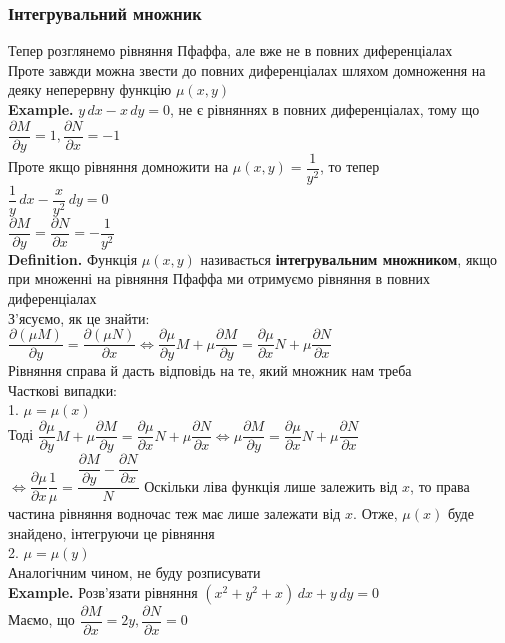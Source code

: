\documentclass[a4paper, 14pt]{extarticle}
\def\bigline{\vspace{5mm}\\}
\begin{document}
\subsubsection{Інтегрувальний множник}
Тепер розглянемо рівняння Пфаффа, але вже не в повних диференціалах\\
Проте завжди можна звести до повних диференціалах шляхом домноження на деяку неперервну функцію $\mu(x,y)$
\bigline
\textbf{Example.} $y\,dx - x\,dy = 0$, не є рівняннях в повних диференціалах, тому що\\
$\dfrac{\partial M}{\partial y} = 1, \dfrac{\partial N}{\partial x} = -1$\\
Проте якщо рівняння домножити на $\mu(x,y) = \dfrac{1}{y^2}$, то тепер\\
$\dfrac{1}{y}\,dx - \dfrac{x}{y^2}\,dy = 0$\\
$\dfrac{\partial M}{\partial y} = \dfrac{\partial N}{\partial x} = -\dfrac{1}{y^2}$
\bigline
\textbf{Definition.} Функція $\mu(x,y)$ називається \textbf{інтегрувальним множником}, якщо при множенні на рівняння Пфаффа ми отримуємо рівняння в повних диференціалах
\bigline
З'ясуємо, як це знайти:\\
$\dfrac{\partial (\mu M)}{\partial y} = \dfrac{\partial(\mu N)}{\partial x} \iff \dfrac{\partial \mu}{\partial y} M + \mu \dfrac{\partial M}{\partial y} = \dfrac{\partial \mu}{\partial x} N + \mu \dfrac{\partial N}{\partial x}$\\
Рівняння справа й дасть відповідь на те, який множник нам треба
\bigline
Часткові випадки:\\
1. $\mu = \mu(x)$\\
Тоді $\dfrac{\partial \mu}{\partial y} M + \mu \dfrac{\partial M}{\partial y} = \dfrac{\partial \mu}{\partial x} N + \mu \dfrac{\partial N}{\partial x} \iff \mu \dfrac{\partial M}{\partial y} = \dfrac{\partial \mu}{\partial x} N + \mu \dfrac{\partial N}{\partial x}$\\
$\iff \dfrac{\partial \mu}{\partial x} \dfrac{1}{\mu} = \dfrac{\dfrac{\partial M}{\partial y} - \dfrac{\partial N}{\partial x}}{N}$
Оскільки ліва функція лише залежить від $x$, то права частина рівняння водночас теж має лише залежати від $x$. Отже, $\mu(x)$ буде знайдено, інтегруючи це рівняння
\bigline
2. $\mu = \mu(y)$\\
Аналогічним чином, не буду розписувати
\bigline
\textbf{Example.} Розв'язати рівняння $(x^2+y^2+x)\,dx + y\,dy = 0$\\
Маємо, що $\dfrac{\partial M}{\partial x} = 2y, \dfrac{\partial N}{\partial x} = 0$\\
\end{document}
